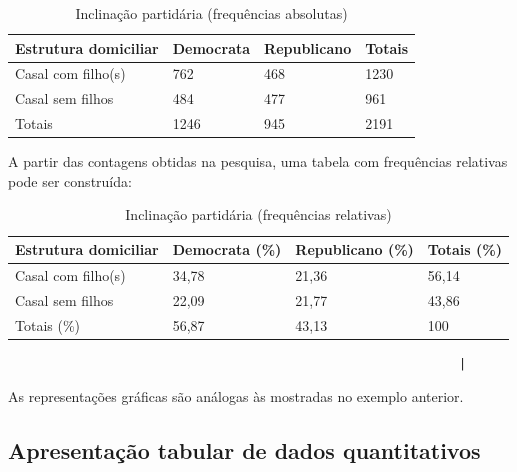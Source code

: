 \documentclass[
]{book}
\begin{document}
\hfill\break

\begin{table}[h]
\centering
\caption{Inclinação partidária (frequências absolutas)}
\begin{tabular}{|l|l|l|l|}
\hline
Estrutura domiciliar    & Democrata          & Republicano &  Totais        \\
\hline
Casal com filho(s)    & 762                & 468         & 1230            \\
Casal sem filhos      & 484                & 477         & 961             \\
\hline
Totais                & 1246               & 945         & 2191           \\
\hline
\end{tabular}
\end{table} 

\hfill\break

A partir das contagens obtidas na pesquisa, uma tabela com frequências relativas pode ser construída:

\hfill\break

\begin{table}[h]
\centering
\caption{Inclinação partidária (frequências relativas)}
\begin{tabular}{|l|l|l|l|}
\hline
Estrutura domiciliar    & Democrata (\%)          & Republicano (\%) &  Totais  (\%)      \\
\hline
Casal com filho(s)    & 34,78                & 21,36         & 56,14            \\
Casal sem filhos      & 22,09                & 21,77         & 43,86             \\
\hline
Totais (\%)               & 56,87               & 43,13         & 100           \\
\hline
\end{tabular}
\end{table} 

\begin{verbatim}
                                                               |
\end{verbatim}

As representações gráficas são análogas às mostradas no exemplo anterior.

\hfill\break

\hypertarget{apresentauxe7uxe3o-tabular-de-dados-quantitativos}{%
\subsection{Apresentação tabular de dados quantitativos}\label{apresentauxe7uxe3o-tabular-de-dados-quantitativos}}
\end{document}
